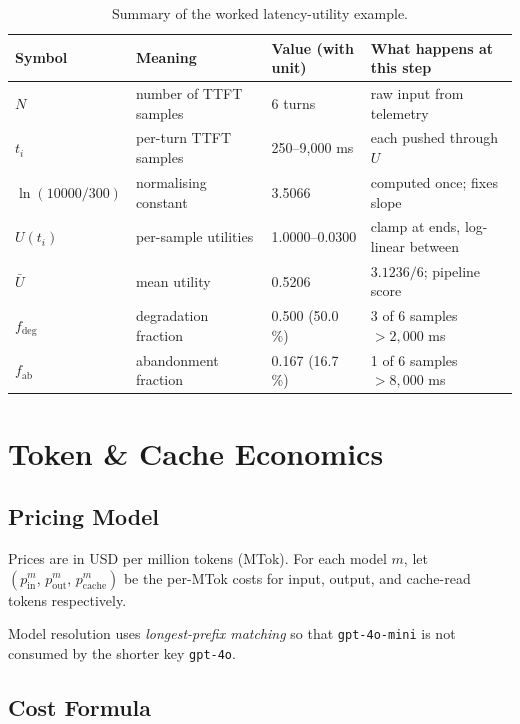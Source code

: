 \documentclass[11pt,a4paper]{article}
\begin{document}
\begin{table}[h!]
\centering
\caption{Summary of the worked latency-utility example.}
\label{tab:latency-worked}
\begin{tabular}{@{}llll@{}}
\toprule
Symbol & Meaning & Value (with unit) & What happens at this step \\
\midrule
$N$ & number of TTFT samples & 6 turns & raw input from telemetry \\
$t_i$ & per-turn TTFT samples & 250--9{,}000 ms & each pushed through $U$ \\
$\ln(10000/300)$ & normalising constant & 3.5066 & computed once; fixes slope \\
$U(t_i)$ & per-sample utilities & 1.0000--0.0300 & clamp at ends, log-linear between \\
$\bar{U}$ & mean utility & 0.5206 & $3.1236 / 6$; pipeline score \\
$f_{\text{deg}}$ & degradation fraction & 0.500 (50.0\,\%) & 3 of 6 samples $> 2{,}000$ ms \\
$f_{\text{ab}}$ & abandonment fraction & 0.167 (16.7\,\%) & 1 of 6 samples $> 8{,}000$ ms \\
\bottomrule
\end{tabular}
\end{table}

\section{Token \& Cache Economics}
\label{sec:token-economics}

\subsection{Pricing Model}

Prices are in USD per million tokens (MTok).  For each model $m$, let
$(p^m_{\text{in}},\, p^m_{\text{out}},\, p^m_{\text{cache}})$ be the
per-MTok costs for input, output, and cache-read tokens respectively.

Model resolution uses \emph{longest-prefix matching} so that
\texttt{gpt-4o-mini} is not consumed by the shorter key \texttt{gpt-4o}.

\subsection{Cost Formula}
\end{document}
